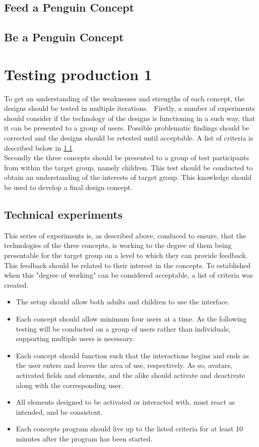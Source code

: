 \subsection{Feed a Penguin Concept}

\subsection{Be a Penguin Concept}



\section{Testing production 1}
To get an understanding of the weaknesses and strengths of each concept, the designs should be tested in multiple iterations. \ 
Firstly, a number of experiments should consider if the technology of the designs is functioning in a such way, that it can be presented to a group of users. Possible problematic findings should be corrected and the designs should be retested until acceptable. A list of criteria is described below in \ref{techExP1}\\
Secondly the three concepts should be presented to a group of test participants from within the target group, namely children. This test should be conducted to obtain an understanding of the interests of target group. This knowledge should be used to develop a final design concept. 

\subsection{Technical experiments}\label{techExP1}
This series of experiments is, as described above, conduced to ensure, that the technologies of the three concepts, is working to the degree of them being presentable for the target group on a level to which they can provide feedback. This feedback should be related to their interest in the concepts. To established when this "degree of working" can be considered acceptable, a list of criteria was created. 

\begin{itemize}
    \item The setup should allow both adults and children to use the interface. 
       \item Each concept should allow minimum four users at a time. As the following testing will be conducted on a group of users rather than individuals, supporting multiple users is necessary.
    \item Each concept should function such that the interactions begins and ends as the user enters and leaves the area of use, respectively. As so, avatars, activated fields and elements, and the alike should activate and deactivate along with the corresponding user. 
    \item All elements designed to be activated or interacted with, must react as intended, and be consistent.  
    \item Each concepts program should live up to the listed criteria for at least 10 minutes after the program has been started.
\end{itemize}

